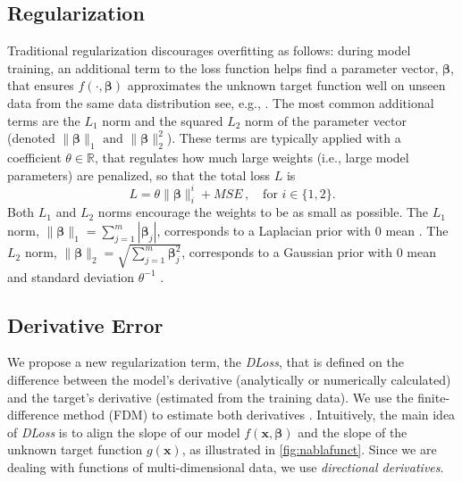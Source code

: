 \documentclass[conference]{IEEEtran}
\begin{document}
\subsection{Regularization}
Traditional regularization discourages overfitting as follows: during model training, an additional term to the loss function helps find a parameter vector, $\boldsymbol{\beta}$, that ensures $f(\cdot,\boldsymbol{\beta})$ approximates the unknown target function well on unseen data from the same data distribution see, e.g., \cite{Kukacka2017regsurvey}.
The most common additional terms are the $L_1$ norm and the squared $L_2$ norm of the parameter vector (denoted $\|\boldsymbol{\beta}\|_1\mbox{ and } \|\boldsymbol{\beta}\|_2^2$). These terms are typically applied with a coefficient $\theta \in \mathbb{R}$, that regulates how much large weights (i.e., large model parameters) are penalized, so that the total loss $L$ is
\begin{equation}
 L = \theta \|\boldsymbol{\beta}\|_i^i + MSE\,,\quad\mbox{for }i \in \{1,2\}.
\end{equation}
Both $L_1$ and $L_2$ norms encourage the weights to be as small as possible.
The $L_1$ norm, $\|\boldsymbol{\beta}\|_1 = \sum_{j=1}^m |\boldsymbol{\beta}_j|$, corresponds to a Laplacian prior with 0 mean \cite{williams1995bayesian,plaut86,tibshirani1996L1}. The $L_2$ norm, $\|\boldsymbol{\beta}\|_2 = \sqrt{ \sum_{j=1}^m \boldsymbol{\beta}_j^2}$, corresponds to a Gaussian prior with 0 mean and standard deviation $\theta^{-1}$ \cite{rennie2003l2,Bishop95}.
 



\subsection{Derivative Error}\label{subsec_regulmethod}

We propose a new regularization term, the \emph{DLoss}, that is defined on the difference between the model's derivative (analytically or numerically calculated) and the target's derivative (estimated from the training data).
We use the finite-difference method (FDM) to estimate both derivatives \cite{paszynski2021deep,samaniego2020energy}. 
Intuitively, the main idea of \emph{DLoss} is to align the slope of our model $f(\mathbf{x},\boldsymbol{\beta})$ and the slope of the unknown target function $g(\mathbf{x})$, as illustrated in \autoref{fig:nablafunct}.
Since we are dealing with %
functions of multi-dimensional data, we use \emph{directional derivatives}.
\end{document}

